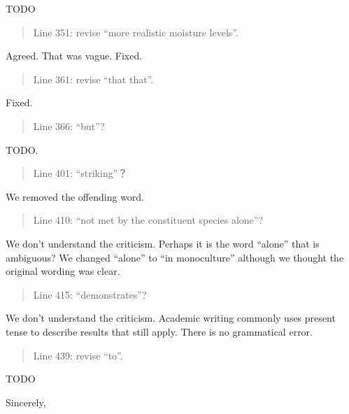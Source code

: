 \documentclass[letterpaper, 12pt]{letter}
\begin{document}
\begin{letter}{}
TODO

\begin{quote}
Line 351: revise “more realistic moisture levels”.
\end{quote}

Agreed. That was vague. Fixed.

\begin{quote}
Line 361: revise “that that”.
\end{quote}

Fixed.

\begin{quote}
Line 366: “but”?
\end{quote}

TODO.

\begin{quote}
Line 401: “striking”？
\end{quote}

We removed the offending word.

\begin{quote}
Line 410: “not met by the constituent species alone”?
\end{quote}

We don't understand the criticism. Perhaps it is the word ``alone'' that is ambiguous?  We changed ``alone'' to ``in monoculture'' although we thought the original wording was clear.

\begin{quote}
Line 415: “demonstrates”?
\end{quote}

We don't understand the criticism. Academic writing commonly uses present tense to describe results that still apply. There is no grammatical error.

\begin{quote}
Line 439: revise “to”.
\end{quote}

TODO

\closing{Sincerely,}

\end{letter}
\end{document}
